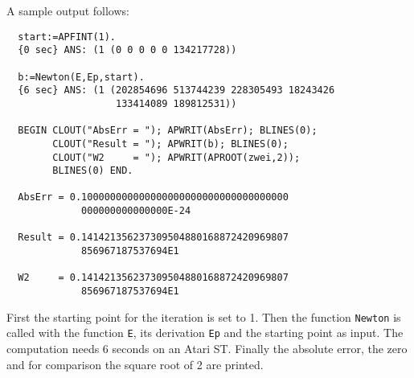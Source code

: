 A sample output follows:
\begin{verbatim}
  start:=APFINT(1).
  {0 sec} ANS: (1 (0 0 0 0 0 134217728))

  b:=Newton(E,Ep,start).
  {6 sec} ANS: (1 (202854696 513744239 228305493 18243426 
                   133414089 189812531))

  BEGIN CLOUT("AbsErr = "); APWRIT(AbsErr); BLINES(0); 
        CLOUT("Result = "); APWRIT(b); BLINES(0); 
        CLOUT("W2     = "); APWRIT(APROOT(zwei,2)); 
        BLINES(0) END. 
 
  AbsErr = 0.100000000000000000000000000000000000
             000000000000000E-24
 
  Result = 0.141421356237309504880168872420969807
             856967187537694E1
  
  W2     = 0.141421356237309504880168872420969807
             856967187537694E1
\end{verbatim}
First the starting point for the iteration is set to 1.
Then the function \verb/Newton/ is called with 
the function \verb/E/, its derivation \verb/Ep/
and the starting point as input.
The computation needs 6 seconds on an Atari ST. 
Finally the absolute error, the zero and
for comparison the square root of 2 are printed.
